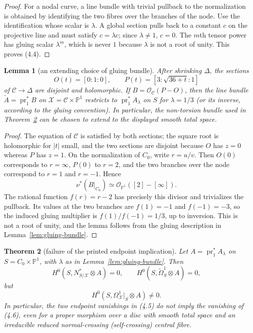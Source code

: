 \documentclass[11pt]{amsart}
\renewcommand{\P}{\mathbb P}
\newcommand{\cO}{\mathcal O}
\theoremstyle{plain}
\newtheorem{theorem}{Theorem}[section]
\newtheorem{lemma}[theorem]{Lemma}
\theoremstyle{definition}
\theoremstyle{remark}
\begin{document}
\begin{proof}
For a nodal curve, a line bundle with trivial pullback to the normalization
is obtained by identifying the two fibres over the branches of the node.
Use the identification whose scalar is $\lambda$.  A global section pulls
back to a constant $c$ on the projective line and must satisfy
$c=\lambda c$; since $\lambda\ne1$, $c=0$.  The $m$th tensor power has
gluing scalar $\lambda^m$, which is never $1$ because $\lambda$ is not a
root of unity.  This proves (4.4).
\end{proof}

\begin{lemma}[an extending choice of gluing bundle]
\label{lem:extending-gluing}
After shrinking $\Delta$, the sections
\[
 O(t)=[0:1:0],\qquad
 P(t)=[3:\sqrt{36+t}:1]
\tag{4.5a}
\]
of $\mathscr C\to\Delta$ are disjoint and holomorphic.  If
$B=\cO_{\mathscr C}(P-O)$, then the line bundle
$\widetilde A=\operatorname{pr}_1^*B$ on $\mathcal X=\mathscr C\times\P^1$
restricts to $\operatorname{pr}_1^*A_{\lambda}$ on $S$ for
$\lambda=1/3$ (or its inverse, according to the gluing convention).  In
particular, the non-torsion bundle used in Theorem~\ref{thm:nodal-test} can
be chosen to extend to the displayed smooth total space.
\end{lemma}

\begin{proof}
The equation of $\mathscr C$ is satisfied by both sections; the square root
is holomorphic for $|t|$ small, and the two sections are disjoint because
$O$ has $z=0$ whereas $P$ has $z=1$.  On the normalization of $C_0$, write
$r=u/v$.  Then $O(0)$ corresponds to $r=\infty$, $P(0)$ to $r=2$, and the
two branches over the node correspond to $r=1$ and $r=-1$.  Hence
\[
 \nu^*(B|_{C_0})\simeq\cO_{\P^1}([2]-[\infty]).
\]
The rational function $f(r)=r-2$ has precisely this divisor and trivializes
the pullback.  Its values at the two branches are $f(1)=-1$ and
$f(-1)=-3$, so the induced gluing multiplier is $f(1)/f(-1)=1/3$,
up to inversion.  This is not a root of unity, and the lemma follows from
the gluing description in Lemma~\ref{lem:gluing-bundle}.
\end{proof}

\begin{theorem}[failure of the printed endpoint implication]
\label{thm:nodal-test}
Let $A=\operatorname{pr}_1^*A_\lambda$ on
$S=C_0\times\P^1$, with $\lambda$ as in Lemma~\ref{lem:gluing-bundle}.
Then
\[
 H^0(S,N^*_{S/\mathcal X}\otimes A)=0,
 \qquad
 H^0(S,\widetilde\Omega^1_S\otimes A)=0,
 \tag{4.5}
\]
but
\[
 H^0(S,\Omega^1_{\mathcal X}|_S\otimes A)\ne0.
 \tag{4.6}
\]
In particular, the two endpoint vanishings in (4.5) do not imply the
vanishing of (4.6), even for a proper morphism over a disc with smooth total
space and an irreducible reduced normal-crossing (self-crossing) central
fibre.
\end{theorem}
\end{document}
